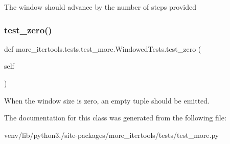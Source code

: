\begin{DoxyVerb}The window should advance by the number of steps provided\end{DoxyVerb}
 \mbox{\label{classmore__itertools_1_1tests_1_1test__more_1_1_windowed_tests_a7d6b87aa34de99502c79a325d6cfbfe3}} 
\subsubsection{\texorpdfstring{test\+\_\+zero()}{test\_zero()}}
{\footnotesize\ttfamily def more\+\_\+itertools.\+tests.\+test\+\_\+more.\+Windowed\+Tests.\+test\+\_\+zero (\begin{DoxyParamCaption}\item[{}]{self }\end{DoxyParamCaption})}

\begin{DoxyVerb}When the window size is zero, an empty tuple should be emitted.\end{DoxyVerb}
 

The documentation for this class was generated from the following file\+:\begin{DoxyCompactItemize}
\item 
venv/lib/python3./site-\/packages/more\+\_\+itertools/tests/test\+\_\+more.\+py\end{DoxyCompactItemize}
